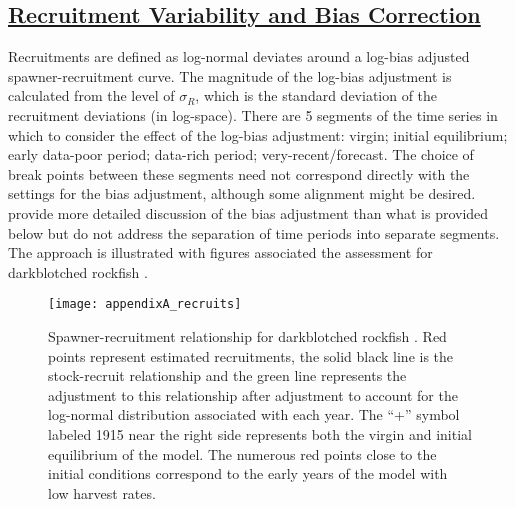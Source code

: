 \hypertarget{BiasCorrect}{}
\subsection[Recruitment Variability and Bias Correction]{\protect\hyperlink{BiasCorrect}{Recruitment Variability and Bias Correction}}

Recruitments are defined as log-normal deviates around a log-bias adjusted spawner-recruitment curve. The magnitude of the log-bias adjustment is calculated from the level of $\sigma_R$, which is the standard deviation of the recruitment deviations (in log-space). There are 5 segments of the time series in which to consider the effect of the log-bias adjustment: virgin; initial equilibrium; early data-poor period; data-rich period; very-recent/forecast. The choice of break points between these segments need not correspond directly with the settings for the bias adjustment, although some alignment might be desired. \citet{methot-adjusting-2011} provide more detailed discussion of the bias adjustment than what is provided below but do not address the separation of time periods into separate segments. The approach is illustrated with figures associated the assessment for darkblotched rockfish \citep{gertseva-status-2013}.

\begin{figure}[H]
	\begin{center}
		\texttt{[image: appendixA\_recruits]}\\
	\end{center}	
	\caption{Spawner-recruitment relationship for darkblotched rockfish \citep{gertseva-status-2013}. Red points represent estimated recruitments, the solid black line is the stock-recruit relationship and the green line represents the adjustment to this relationship after adjustment to account for the log-normal distribution associated with each year. The ``+'' symbol labeled 1915 near the right side represents both the virgin and initial equilibrium of the model. The numerous red points close to the initial conditions correspond to the early years of the model with low harvest rates.}
	\label{fig:recruits}	
\end{figure}

